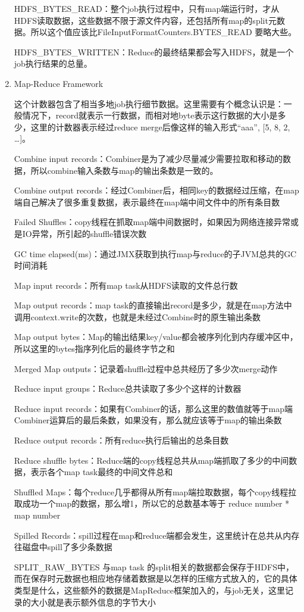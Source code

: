 \begin{enumerate}
HDFS\_BYTES\_READ：整个job执行过程中，只有map端运行时，才从HDFS读取数据，这些数据不限于源文件内容，还包括所有map的split元数据。所以这个值应该比FileInputFormatCounters.BYTES\_READ 要略大些。 

HDFS\_BYTES\_WRITTEN：Reduce的最终结果都会写入HDFS，就是一个job执行结果的总量。 


\item Map-Reduce Framework

这个计数器包含了相当多地job执行细节数据。这里需要有个概念认识是：一般情况下，record就表示一行数据，而相对地byte表示这行数据的大小是多少，这里的计数器表示经过reduce merge后像这样的输入形式{“aaa”, [5, 8, 2, …]}。 


Combine input records：Combiner是为了减少尽量减少需要拉取和移动的数据，所以combine输入条数与map的输出条数是一致的。 

Combine output records：经过Combiner后，相同key的数据经过压缩，在map端自己解决了很多重复数据，表示最终在map端中间文件中的所有条目数 

Failed Shuffles：copy线程在抓取map端中间数据时，如果因为网络连接异常或是IO异常，所引起的shuffle错误次数 

GC time elapsed(ms)：通过JMX获取到执行map与reduce的子JVM总共的GC时间消耗 

Map input records：所有map task从HDFS读取的文件总行数 

Map output records：map task的直接输出record是多少，就是在map方法中调用context.write的次数，也就是未经过Combine时的原生输出条数 

Map output bytes：Map的输出结果key/value都会被序列化到内存缓冲区中，所以这里的bytes指序列化后的最终字节之和 

Merged Map outputs：记录着shuffle过程中总共经历了多少次merge动作 

Reduce input groups：Reduce总共读取了多少个这样的计数器 

Reduce input records：如果有Combiner的话，那么这里的数值就等于map端Combiner运算后的最后条数，如果没有，那么就应该等于map的输出条数 

Reduce output records：所有reduce执行后输出的总条目数 

Reduce shuffle bytes：Reduce端的copy线程总共从map端抓取了多少的中间数据，表示各个map task最终的中间文件总和 

Shuffled Maps：每个reduce几乎都得从所有map端拉取数据，每个copy线程拉取成功一个map的数据，那么增1，所以它的总数基本等于 reduce number * map number 

Spilled Records：spill过程在map和reduce端都会发生，这里统计在总共从内存往磁盘中spill了多少条数据 

SPLIT\_RAW\_BYTES 
与map task 的split相关的数据都会保存于HDFS中，而在保存时元数据也相应地存储着数据是以怎样的压缩方式放入的，它的具体类型是什么，这些额外的数据是MapReduce框架加入的，与job无关，这里记录的大小就是表示额外信息的字节大小 

\end{enumerate}
	
